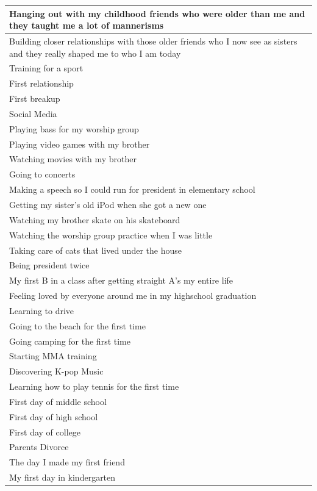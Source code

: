 \documentclass[
  .7em,
  letterpaper,
  DIV=11,
  numbers=noendperiod]{scrartcl}
\begin{document}
\begin{table}
\begin{tabular}{l}
\hline
Hanging out with my childhood friends who were older than me and they taught me a lot of mannerisms\\
\hline
Building closer relationships with those older friends who I now see as sisters and they really shaped me to who I am today\\
\hline
Training for a sport\\
\hline
First relationship\\
\hline
First breakup\\
\hline
Social Media\\
\hline
Playing bass for my worship group\\
\hline
Playing video games with my brother\\
\hline
Watching movies with my brother\\
\hline
Going to concerts\\
\hline
Making a speech so I could run for president in elementary school\\
\hline
Getting my sister's old iPod when she got a new one\\
\hline
Watching my brother skate on his skateboard\\
\hline
Watching the worship group practice when I was little\\
\hline
Taking care of cats that lived under the house\\
\hline
Being president twice\\
\hline
My first B in a class after getting straight A’s my entire life\\
\hline
Feeling loved by everyone around me in my highschool graduation\\
\hline
Learning to drive\\
\hline
Going to the beach for the first time\\
\hline
Going camping for the first time\\
\hline
Starting MMA training\\
\hline
Discovering K-pop Music\\
\hline
Learning how to play tennis for the first time\\
\hline
First day of middle school\\
\hline
First day of high school\\
\hline
First day of college\\
\hline
Parents Divorce\\
\hline
The day I made my first friend\\
\hline
My first day in kindergarten\\

\end{tabular}
\end{table}
\end{document}
